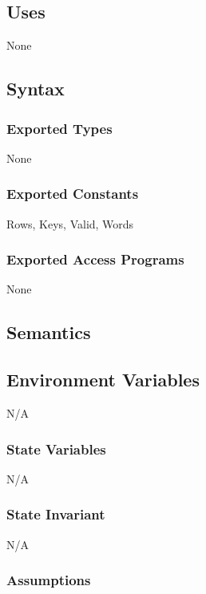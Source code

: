 \documentclass[12pt]{article}
\begin{document}
\subsection* {Uses}

None

\subsection* {Syntax}

\subsubsection* {Exported Types}

None

\subsubsection* {Exported Constants}

Rows, Keys, Valid, Words

\subsubsection* {Exported Access Programs}

None

\subsection* {Semantics}

\subsection*{Environment Variables}

N/A

\subsubsection* {State Variables}
N/A

\subsubsection* {State Invariant}

N/A

\subsubsection* {Assumptions}
\end{document}
